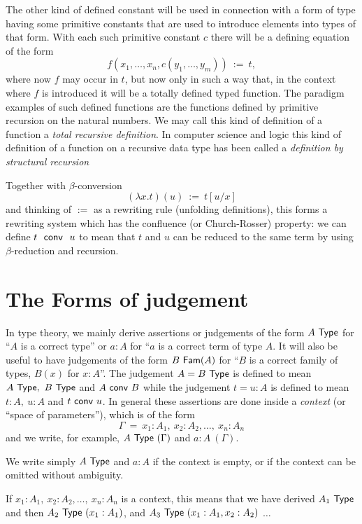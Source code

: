 \documentclass[10pt,a4paper]{article}
\newcommand{\Type}{{\sf Type}}
\newcommand{\conv}{~{\sf conv}~}
\newcommand{\Fam}{{\sf Fam}}
\begin{document}
The other kind of defined constant will be used in connection with a form of type having some primitive constants that are used to introduce elements into types of that form.  With each such primitive constant $c$ there will be a defining equation of the form
$$
f(x_1,\dots,x_n,c(y_1,\dots,y_m)) ~:=~ t,
$$
where now $f$ may occur in $t$, but now only in such a way that, in the context where $f$ is introduced it will be a totally defined typed function.
The paradigm examples of such defined functions are the functions defined by primitive recursion on the natural numbers.  We may call this kind of definition of a function a {\em total recursive definition}.  In computer science and logic this kind of definition of a function on a recursive data type has been called a {\em definition by structural recursion}

Together with $\beta$-conversion
$$
(\lambda x.t)(u) ~:=~ t[u/x]
$$
and thinking of $:=$ as a rewriting rule (unfolding definitions),
this forms a rewriting system which has the confluence (or Church-Rosser) property: we can
define $t~\conv~u$ to mean that $t$ and $u$ can be reduced to the same term by using
$\beta$-reduction and recursion.

\section*{The Forms of judgement}

 In type theory, we mainly derive assertions or judgements of the form $A~\Type$ for ``$A$ is a correct type'' or $a:A$ for ``$a$ is a correct term of type $A$.  It will also be useful to have judgements of the form $B~\Fam(A)$
for ``$B$ is a correct family of types, $B(x)$ for $x:A$''.
The judgement $A=B~\Type$ is defined to mean $A~\Type,~B~\Type$ and $A\conv B$
while the judgement $t=u:A$ is defined to mean $t:A,~u:A$ and $t\conv u$.
In general
these assertions are done inside a {\em context} (or ``space of parameters''), which is of
the form
$$
\Gamma ~=~  x_1:A_1,~x_2:A_2,\dots,~x_n:A_n
$$
and we write, for example, $A~\Type~(\Gamma)$ and $a:A~(\Gamma)$. 

 We write simply $A~\Type$ and $a:A$ if the context is empty, or if the context
can be omitted without ambiguity.

 If $x_1:A_1,~x_2:A_2,\dots,~x_n:A_n$ is a context, this means that we have
derived $A_1~\Type$ and then $A_2~\Type~(x_1:A_1)$, and $A_3~\Type~(x_1:A_1,x_2:A_2)$
$\dots$

\medskip
\end{document}

